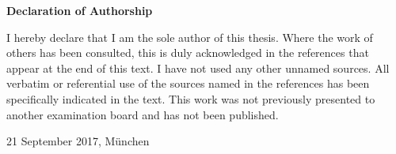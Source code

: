 \documentclass[fontsize=11pt,a4paper,parskip=half]{scrbook}
\begin{document}
\thispagestyle{empty}

\vspace*{2cm}

\begin{centering}
	\sffamily\bfseries \LARGE Declaration of Authorship\\
\end{centering}
\vspace{1.25cm}
 
I hereby declare that I am the sole author of this thesis. Where the work of others has been consulted, this is duly acknowledged in the references that appear at the end of this text. I have not used any other unnamed sources. All verbatim or referential use of the sources named in the references has been specifically indicated in the text. This work was not previously presented to another examination board and has not been published. 
\vspace{3cm}

\begin{flushright}
	21 September 2017, M\"unchen
\end{flushright}

\clearpage
\end{document}

